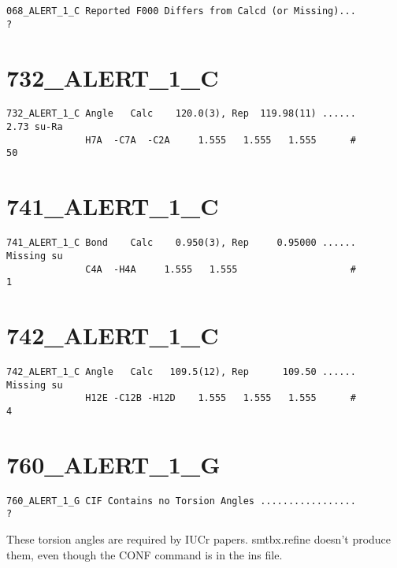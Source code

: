 \documentclass[a4paper,10pt]{article}
\begin{document}
{\bf
\begin{verbatim}
068_ALERT_1_C Reported F000 Differs from Calcd (or Missing)...          ?
\end{verbatim}
}


\section*{732\_ALERT\_1\_C}

{\bf
\begin{verbatim}
732_ALERT_1_C Angle   Calc    120.0(3), Rep  119.98(11) ......       2.73 su-Ra
              H7A  -C7A  -C2A     1.555   1.555   1.555      #         50
\end{verbatim}
}


\section*{741\_ALERT\_1\_C}

{\bf
\begin{verbatim}
741_ALERT_1_C Bond    Calc    0.950(3), Rep     0.95000 ......    Missing su
              C4A  -H4A     1.555   1.555                    #          1
\end{verbatim}
}


\section*{742\_ALERT\_1\_C}

{\bf
\begin{verbatim}
742_ALERT_1_C Angle   Calc   109.5(12), Rep      109.50 ......    Missing su
              H12E -C12B -H12D    1.555   1.555   1.555      #          4
\end{verbatim}
}


\section*{760\_ALERT\_1\_G}

{\bf
\begin{verbatim}
760_ALERT_1_G CIF Contains no Torsion Angles .................          ?
\end{verbatim}
}

These torsion angles are required by IUCr papers. smtbx.refine doesn't produce them, even though the CONF command is in the ins file.
\end{document}
